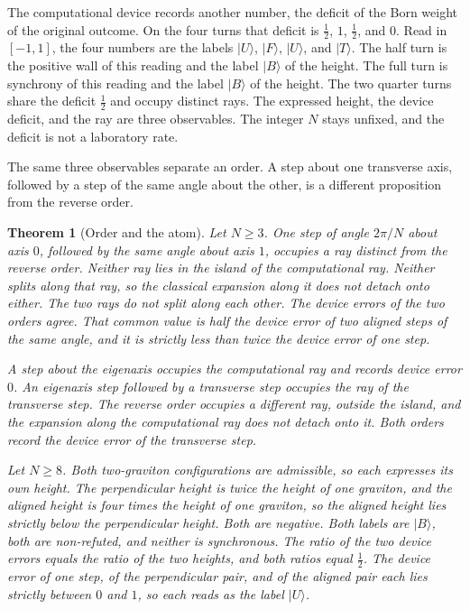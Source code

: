 \documentclass[a4paper]{article}
\newtheorem{theorem}{Theorem}[section]
\theoremstyle{definition}
\begin{document}
The computational device records another number, the deficit of the
Born weight of the original outcome. On the four turns that deficit is
\(\frac12\), \(1\), \(\frac12\), and \(0\). Read in \([-1,1]\), the four
numbers are the labels \(\lvert U\rangle\), \(\lvert F\rangle\),
\(\lvert U\rangle\), and \(\lvert T\rangle\). The half turn is the
positive wall of this reading and the label \(\lvert B\rangle\) of the
height. The full turn is synchrony of this reading and the label
\(\lvert B\rangle\) of the height. The two quarter turns share the
deficit \(\frac12\) and occupy distinct rays. The expressed height, the
device deficit, and the ray are three observables. The integer \(N\)
stays unfixed, and the deficit is not a laboratory rate.

The same three observables separate an order. A step about one
transverse axis, followed by a step of the same angle about the other,
is a different proposition from the reverse order.

\begin{theorem}[Order and the atom]
\label{thm:order}
Let \(N\ge 3\). One step of angle \(2\pi/N\) about axis \(0\), followed
by the same angle about axis \(1\), occupies a ray distinct from the
reverse order. Neither ray lies in the island of the computational ray.
Neither splits along that ray, so the classical expansion along it does
not detach onto either. The two rays do not split along each other.
The device errors of the two orders agree. That common value is half
the device error of two aligned steps of the same angle, and it is
strictly less than twice the device error of one step.

A step about the eigenaxis occupies the computational ray and records
device error \(0\). An eigenaxis step followed by a transverse step
occupies the ray of the transverse step. The reverse order occupies a
different ray, outside the island, and the expansion along the
computational ray does not detach onto it. Both orders record the
device error of the transverse step.

Let \(N\ge 8\). Both two-graviton configurations are admissible, so
each expresses its own height. The perpendicular height is twice the
height of one graviton, and the aligned height is four times the
height of one graviton, so the aligned height lies strictly below the
perpendicular height. Both are negative. Both labels are \(\lvert B\rangle\), both
are non-refuted, and neither is synchronous. The ratio of the two
device errors equals the ratio of the two heights, and both ratios
equal \(\frac12\). The device error of one step, of the perpendicular
pair, and of the aligned pair each lies strictly between \(0\) and
\(1\), so each reads as the label \(\lvert U\rangle\).
\end{theorem}
\end{document}
